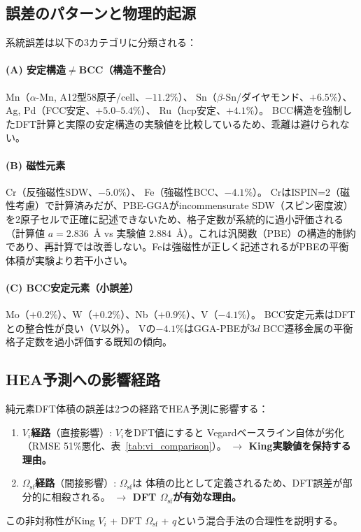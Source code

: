 \documentclass[5p,10pt]{elsarticle}
\begin{document}
\subsection{誤差のパターンと物理的起源}

系統誤差は以下の3カテゴリに分類される：

\paragraph{(A) 安定構造$\neq$BCC（構造不整合）}
Mn（$\alpha$-Mn, A12型58原子/cell、$-11.2\%$）、
Sn（$\beta$-Sn/ダイヤモンド、$+6.5\%$）、
Ag, Pd（FCC安定、$+5.0$--$5.4\%$）、
Ru（hcp安定、$+4.1\%$）。
BCC構造を強制したDFT計算と実際の安定構造の実験値を比較しているため、乖離は避けられない。

\paragraph{(B) 磁性元素}
Cr（反強磁性SDW、$-5.0\%$）、
Fe（強磁性BCC、$-4.1\%$）。
CrはISPIN=2（磁性考慮）で計算済みだが、PBE-GGAがincommensurate SDW（スピン密度波）を2原子セルで正確に記述できないため、格子定数が系統的に過小評価される（計算値 $a = 2.836$~\AA{} vs 実験値 $2.884$~\AA{}）。これは汎関数（PBE）の構造的制約であり、再計算では改善しない。Feは強磁性が正しく記述されるがPBEの平衡体積が実験より若干小さい。

\paragraph{(C) BCC安定元素（小誤差）}
Mo（$+0.2\%$）、W（$+0.2\%$）、Nb（$+0.9\%$）、V（$-4.1\%$）。
BCC安定元素はDFTとの整合性が良い（V以外）。
Vの$-4.1\%$はGGA-PBEが3$d$ BCC遷移金属の平衡格子定数を過小評価する既知の傾向。

\subsection{HEA予測への影響経路}

純元素DFT体積の誤差は2つの経路でHEA予測に影響する：
\begin{enumerate}
  \item \textbf{$V_i$経路}（直接影響）: $V_i$をDFT値にすると
    Vegardベースライン自体が劣化（RMSE 51\%悪化、表~\ref{tab:vi_comparison}）。
    \textbf{$\to$ King実験値を保持する理由。}
  \item \textbf{$\Omega_\text{sf}$経路}（間接影響）: $\Omega_\text{sf}$は
    体積の比として定義されるため、DFT誤差が部分的に相殺される。
    \textbf{$\to$ DFT $\Omega_\text{sf}$が有効な理由。}
\end{enumerate}
この非対称性がKing $V_i$ + DFT $\Omega_\text{sf}$ + $q$という混合手法の合理性を説明する。
\end{document}
